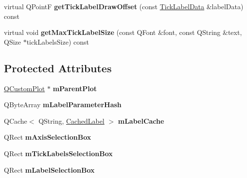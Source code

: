 \begin{DoxyCompactItemize}
\item 
virtual Q\+PointF {\bfseries get\+Tick\+Label\+Draw\+Offset} (const \hyperlink{struct_q_c_p_axis_painter_private_1_1_tick_label_data}{Tick\+Label\+Data} \&label\+Data) const \hypertarget{class_q_c_p_axis_painter_private_a6b02e6fd70cc65f726ca8cb3e6f16de4}{}\label{class_q_c_p_axis_painter_private_a6b02e6fd70cc65f726ca8cb3e6f16de4}

\item 
virtual void {\bfseries get\+Max\+Tick\+Label\+Size} (const Q\+Font \&font, const Q\+String \&text, Q\+Size $\ast$tick\+Labels\+Size) const \hypertarget{class_q_c_p_axis_painter_private_a8a7c82303e272485621fde78a5b674f9}{}\label{class_q_c_p_axis_painter_private_a8a7c82303e272485621fde78a5b674f9}

\end{DoxyCompactItemize}
\subsection*{Protected Attributes}
\begin{DoxyCompactItemize}
\item 
\hyperlink{class_q_custom_plot}{Q\+Custom\+Plot} $\ast$ {\bfseries m\+Parent\+Plot}\hypertarget{class_q_c_p_axis_painter_private_a882029a5f2d4abd71289d415c9b90a28}{}\label{class_q_c_p_axis_painter_private_a882029a5f2d4abd71289d415c9b90a28}

\item 
Q\+Byte\+Array {\bfseries m\+Label\+Parameter\+Hash}\hypertarget{class_q_c_p_axis_painter_private_aab8be59df22ed4e43e3a6d511cbc466a}{}\label{class_q_c_p_axis_painter_private_aab8be59df22ed4e43e3a6d511cbc466a}

\item 
Q\+Cache$<$ Q\+String, \hyperlink{struct_q_c_p_axis_painter_private_1_1_cached_label}{Cached\+Label} $>$ {\bfseries m\+Label\+Cache}\hypertarget{class_q_c_p_axis_painter_private_a07ac270ea0c0ae084debd48d6a740e35}{}\label{class_q_c_p_axis_painter_private_a07ac270ea0c0ae084debd48d6a740e35}

\item 
Q\+Rect {\bfseries m\+Axis\+Selection\+Box}\hypertarget{class_q_c_p_axis_painter_private_a9d7586f4923994488bdd006415b13f5f}{}\label{class_q_c_p_axis_painter_private_a9d7586f4923994488bdd006415b13f5f}

\item 
Q\+Rect {\bfseries m\+Tick\+Labels\+Selection\+Box}\hypertarget{class_q_c_p_axis_painter_private_a0adaf5f1d89be0f32dc4a904d157e5a9}{}\label{class_q_c_p_axis_painter_private_a0adaf5f1d89be0f32dc4a904d157e5a9}

\item 
Q\+Rect {\bfseries m\+Label\+Selection\+Box}\hypertarget{class_q_c_p_axis_painter_private_abac9a47048d537f72ca147b6f29d30f1}{}\label{class_q_c_p_axis_painter_private_abac9a47048d537f72ca147b6f29d30f1}

\end{DoxyCompactItemize}


